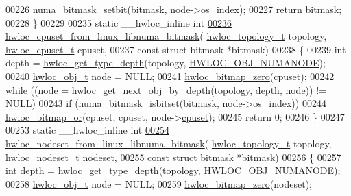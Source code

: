 \begin{DoxyCode}
00226       numa\_bitmask\_setbit(bitmask, node->\hyperlink{a00238_a61a7a80a68eaccbaaa28269e678c81a9}{os\_index});
00227   \textcolor{keywordflow}{return} bitmask;
00228 \}
00229 
00235 \textcolor{keyword}{static} \_\_hwloc\_inline \textcolor{keywordtype}{int}
\hyperlink{a00216_ga37c8421110b1842414809019098794ef}{00236} \hyperlink{a00216_ga37c8421110b1842414809019098794ef}{hwloc\_cpuset\_from\_linux\_libnuma\_bitmask}(
      \hyperlink{a00186_ga9d1e76ee15a7dee158b786c30b6a6e38}{hwloc\_topology\_t} topology, \hyperlink{a00183_ga4bbf39b68b6f568fb92739e7c0ea7801}{hwloc\_cpuset\_t} cpuset,
00237                                         \textcolor{keyword}{const} \textcolor{keyword}{struct} bitmask *bitmask)
00238 \{
00239   \textcolor{keywordtype}{int} depth = \hyperlink{a00187_ga8bec782e21be313750da70cf7428b374}{hwloc\_get\_type\_depth}(topology, 
      \hyperlink{a00184_ggacd37bb612667dc437d66bfb175a8dc55a9d917a3e5497950c6d8948b8e183db5a}{HWLOC\_OBJ\_NUMANODE});
00240   \hyperlink{a00238}{hwloc\_obj\_t} node = NULL;
00241   \hyperlink{a00205_gaa97c5217613c8cae9862287170ea2132}{hwloc\_bitmap\_zero}(cpuset);
00242   \textcolor{keywordflow}{while} ((node = \hyperlink{a00187_gac140a9b939d9fa0b30c4a910efcb0656}{hwloc\_get\_next\_obj\_by\_depth}(topology, depth, node)) != NULL)
00243     \textcolor{keywordflow}{if} (numa\_bitmask\_isbitset(bitmask, node->\hyperlink{a00238_a61a7a80a68eaccbaaa28269e678c81a9}{os\_index}))
00244       \hyperlink{a00205_ga120b8aefb9ce7ef349929656359b1859}{hwloc\_bitmap\_or}(cpuset, cpuset, node->\hyperlink{a00238_a67925e0f2c47f50408fbdb9bddd0790f}{cpuset});
00245   \textcolor{keywordflow}{return} 0;
00246 \}
00247 
00253 \textcolor{keyword}{static} \_\_hwloc\_inline \textcolor{keywordtype}{int}
\hyperlink{a00216_gaaca6bff3086aad5bdbd2f4c5f0ad14cc}{00254} \hyperlink{a00216_gaaca6bff3086aad5bdbd2f4c5f0ad14cc}{hwloc\_nodeset\_from\_linux\_libnuma\_bitmask}(
      \hyperlink{a00186_ga9d1e76ee15a7dee158b786c30b6a6e38}{hwloc\_topology\_t} topology, \hyperlink{a00183_ga37e35730fa7e775b5bb0afe893d6d508}{hwloc\_nodeset\_t} nodeset,
00255                                          \textcolor{keyword}{const} \textcolor{keyword}{struct} bitmask *bitmask)
00256 \{
00257   \textcolor{keywordtype}{int} depth = \hyperlink{a00187_ga8bec782e21be313750da70cf7428b374}{hwloc\_get\_type\_depth}(topology, 
      \hyperlink{a00184_ggacd37bb612667dc437d66bfb175a8dc55a9d917a3e5497950c6d8948b8e183db5a}{HWLOC\_OBJ\_NUMANODE});
00258   \hyperlink{a00238}{hwloc\_obj\_t} node = NULL;
00259   \hyperlink{a00205_gaa97c5217613c8cae9862287170ea2132}{hwloc\_bitmap\_zero}(nodeset);

\end{DoxyCode}
